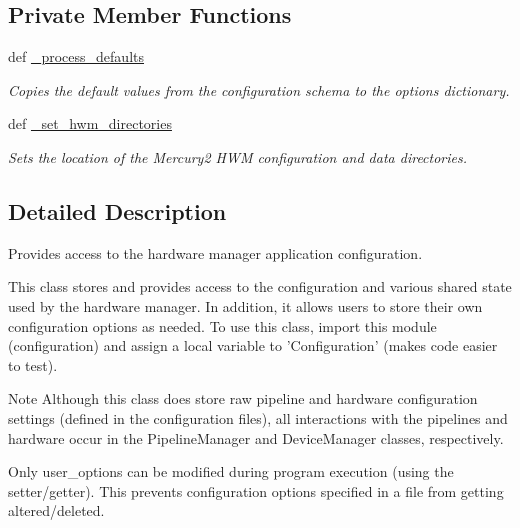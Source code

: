 \subsection*{Private Member Functions}
\begin{DoxyCompactItemize}
\item 
def \hyperlink{classhwm_1_1core_1_1configuration_1_1_config_a1bd7a941f935e03ebab669c64be27e1d}{\-\_\-process\-\_\-defaults}
\begin{DoxyCompactList}\small\item\em Copies the default values from the configuration schema to the options dictionary. \end{DoxyCompactList}\item 
def \hyperlink{classhwm_1_1core_1_1configuration_1_1_config_a80206ae37efd2e366a09ae9923c9e466}{\-\_\-set\-\_\-hwm\-\_\-directories}
\begin{DoxyCompactList}\small\item\em Sets the location of the Mercury2 H\-W\-M configuration and data directories. \end{DoxyCompactList}\end{DoxyCompactItemize}


\subsection{Detailed Description}
Provides access to the hardware manager application configuration. 

This class stores and provides access to the configuration and various shared state used by the hardware manager. In addition, it allows users to store their own configuration options as needed. To use this class, import this module (configuration) and assign a local variable to 'Configuration' (makes code easier to test).

\begin{DoxyNote}{Note}
Although this class does store raw pipeline and hardware configuration settings (defined in the configuration files), all interactions with the pipelines and hardware occur in the Pipeline\-Manager and Device\-Manager classes, respectively. 

Only user\-\_\-options can be modified during program execution (using the setter/getter). This prevents configuration options specified in a file from getting altered/deleted. 
\end{DoxyNote}


